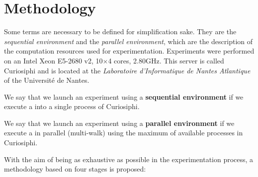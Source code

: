 
\section{Methodology}

Some terms are necessary to be defined for simplification sake. They are the \textit{sequential environment} and the \textit{parallel environment}, which are the description of the computation resources used for experimentation. Experiments were performed on an Intel\R{} Xeon\TM{} E5-2680 v2, 10$\times$4 cores, 2.80GHz. This server is called {\sc Curiosiphi} and is located at the  \textit{Laboratoire d'Informatique de Nantes Atlantique} of the Université de Nantes. %

\begin{definition}\label{def:seq_envir}
We say that we launch an experiment using a \textbf{sequential environment} if we execute a \soset{} into a single process of {\sc Curiosiphi}.
\end{definition}

\begin{definition}\label{def:par_envir}
We say that we launch an experiment using a \textbf{parallel environment} if we execute a \soset{} in parallel (multi-walk) using the maximum of available processes in {\sc Curiosiphi}.
\end{definition}


With the aim of being as exhaustive as possible in the experimentation process, a methodology based on four stages is proposed:

